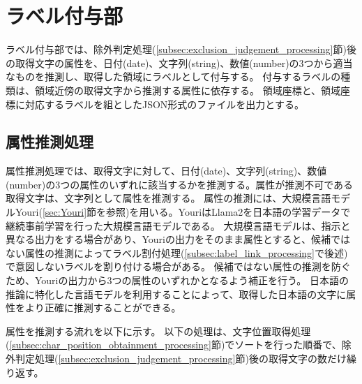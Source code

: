 \section{ラベル付与部}\label{sec:label_link_part}
ラベル付与部では、除外判定処理(\ref{subsec:exclusion_judgement_processing}節)後の取得文字の属性を、日付(date)、文字列(string)、数値(number)の3つから適当なものを推測し、取得した領域にラベルとして付与する。
付与するラベルの種類は、領域近傍の取得文字から推測する属性に依存する。
領域座標と、領域座標に対応するラベルを組としたJSON形式のファイルを出力とする。


\subsection{属性推測処理}\label{subsec:att_prediction_processing}
属性推測処理では、取得文字に対して、日付(date)、文字列(string)、数値(number)の3つの属性のいずれに該当するかを推測する。属性が推測不可である取得文字は、文字列として属性を推測する。
属性の推測には、大規模言語モデルYouri(\ref{sec:Youri}節を参照)を用いる。YouriはLlama2を日本語の学習データで継続事前学習を行った大規模言語モデルである。
大規模言語モデルは、指示と異なる出力をする場合があり、Youriの出力をそのまま属性とすると、候補ではない属性の推測によってラベル割付処理(\ref{subsec:label_link_processing}で後述)で意図しないラベルを割り付ける場合がある。
候補ではない属性の推測を防ぐため、Youriの出力から3つの属性のいずれかとなるよう補正を行う。
日本語の推論に特化した言語モデルを利用することによって、取得した日本語の文字に属性をより正確に推測することができる。

属性を推測する流れを以下に示す。
以下の処理は、文字位置取得処理(\ref{subsec:char_position_obtainment_processing}節)でソートを行った順番で、除外判定処理(\ref{subsec:exclusion_judgement_processing}節)後の取得文字の数だけ繰り返す。

